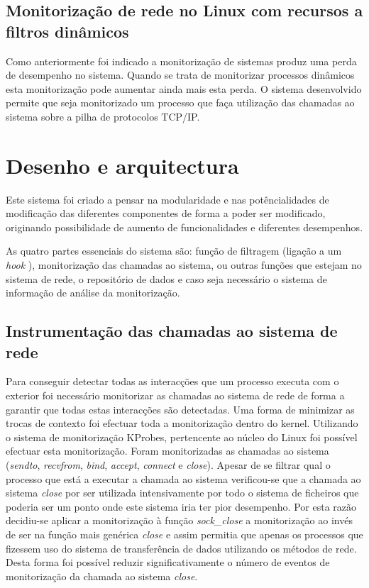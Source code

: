 \documentclass[a4paper]{llncs}
\begin{document}
\subsection{Monitorização de rede no Linux com recursos a filtros dinâmicos}
\label{sub:mon_network__with_dynamic_filters_linux}

Como anteriormente foi indicado a monitorização de sistemas produz uma perda de desempenho no sistema. Quando se trata de monitorizar processos dinâmicos esta monitorização pode aumentar ainda mais esta perda. O sistema desenvolvido permite que seja monitorizado um processo que faça utilização das chamadas ao sistema sobre a pilha de protocolos TCP/IP.


\section{Desenho e arquitectura}
\label{sec:architecture}

Este sistema foi criado a pensar na modularidade e nas potêncialidades de modificação das diferentes componentes de forma a poder ser modificado, originando possibilidade de aumento de funcionalidades e diferentes desempenhos.

As quatro partes essenciais do sistema são: função de filtragem (ligação a um \textit{hook} ), monitorização das chamadas ao sistema, ou outras funções que estejam no sistema de rede, o repositório de dados e caso seja necessário o sistema de informação de análise da monitorização.

\subsection*{Instrumentação das chamadas ao sistema de rede}
\label{sub:mon_syscalls}

Para conseguir detectar todas as interacções que um processo executa com o exterior foi necessário monitorizar as chamadas ao sistema de rede de forma a garantir que todas estas interacções são detectadas. Uma forma de minimizar as trocas de contexto foi efectuar toda a monitorização dentro do kernel. Utilizando o sistema de monitorização KProbes, pertencente ao núcleo do Linux foi possível efectuar esta monitorização. Foram monitorizadas as chamadas ao sistema (\textit{sendto}, \textit{recvfrom}, \textit{bind}, \textit{accept}, \textit{connect} e  \textit{close}).
Apesar de se filtrar qual o processo que está a executar a chamada ao sistema verificou-se que a chamada ao sistema \textit{close} por ser utilizada intensivamente por todo o sistema de ficheiros que poderia ser um ponto onde este sistema iria ter pior desempenho. Por esta razão decidiu-se aplicar a monitorização à função \textit{sock\_close} a monitorização ao invés de ser na função mais genérica \textit{close} e assim permitia que apenas os processos que fizessem uso do sistema de transferência de dados utilizando os métodos de rede. Desta forma foi possível reduzir significativamente o número de eventos de monitorização da chamada ao sistema \textit{close}.
\end{document}
